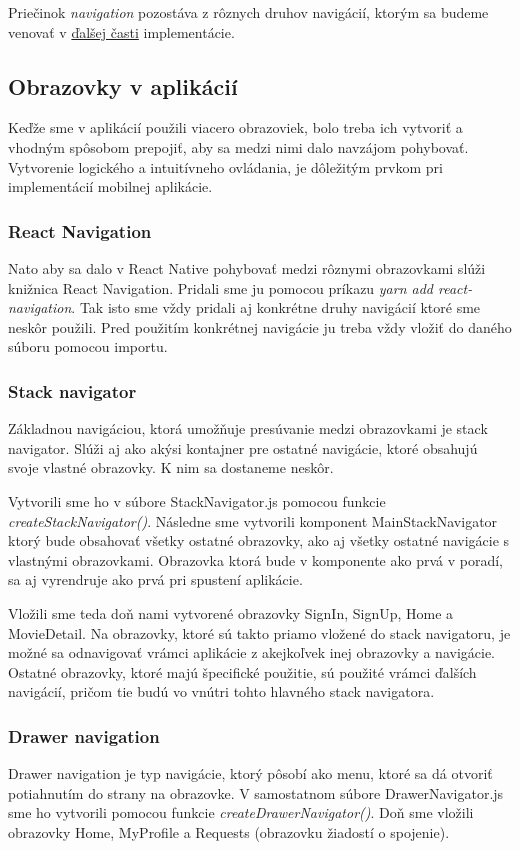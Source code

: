 Priečinok \textit{navigation} pozostáva z rôznych druhov navigácií, ktorým sa budeme venovať v \hyperref[sec:screens]{ďalšej časti} implementácie.

\subsection{Obrazovky v aplikácií}
\label{sec:screens}
Keďže sme v aplikácií použili viacero obrazoviek, bolo treba ich vytvoriť a vhodným spôsobom prepojiť, aby sa medzi nimi dalo navzájom pohybovať. Vytvorenie logického a intuitívneho ovládania, je dôležitým prvkom pri implementácií mobilnej aplikácie.
\subsubsection{React Navigation}
Nato aby sa dalo v React Native pohybovať medzi rôznymi obrazovkami slúži knižnica React Navigation. Pridali sme ju pomocou príkazu \textit{yarn add react-navigation}. Tak isto sme vždy pridali aj konkrétne druhy navigácií ktoré sme neskôr použili. Pred použitím konkrétnej navigácie ju treba vždy vložiť do daného súboru pomocou importu. 
\subsubsection{Stack navigator}
Základnou navigáciou, ktorá umožňuje presúvanie medzi obrazovkami je stack navigator. Slúži aj ako akýsi kontajner pre ostatné navigácie, ktoré obsahujú svoje vlastné obrazovky. K nim sa dostaneme neskôr.

Vytvorili sme ho v súbore StackNavigator.js pomocou funkcie \textit{createStackNavigator()}. Následne sme vytvorili komponent MainStackNavigator ktorý bude obsahovať všetky ostatné obrazovky, ako aj všetky ostatné navigácie s vlastnými obrazovkami. Obrazovka ktorá bude v komponente ako prvá v poradí, sa aj vyrendruje ako prvá pri spustení aplikácie. 

Vložili sme teda doň nami vytvorené obrazovky SignIn, SignUp, Home a MovieDetail. Na obrazovky, ktoré sú takto priamo vložené do stack navigatoru, je možné sa odnavigovať vrámci aplikácie z akejkoľvek inej obrazovky a navigácie. Ostatné obrazovky, ktoré majú špecifické použitie, sú použité vrámci ďalších navigácií, pričom tie budú vo vnútri tohto hlavného stack navigatora. 
\subsubsection{Drawer navigation}
Drawer navigation je typ navigácie, ktorý pôsobí ako menu, ktoré sa dá otvoriť potiahnutím do strany na obrazovke. V samostatnom súbore DrawerNavigator.js sme ho vytvorili pomocou funkcie \textit{createDrawerNavigator()}. Doň sme vložili obrazovky Home, MyProfile a Requests (obrazovku žiadostí o spojenie).

